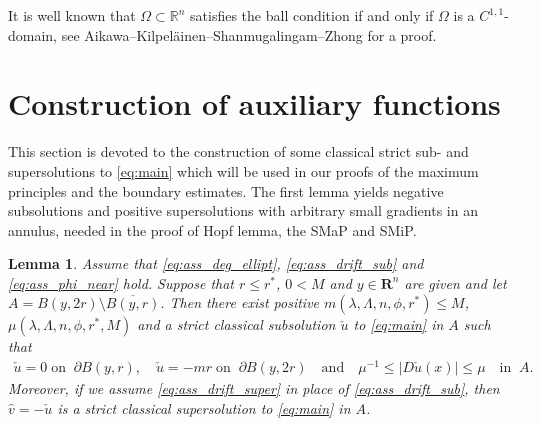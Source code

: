 \documentclass[12pt]{article}
\newtheorem{lemma}[theorem]{Lemma}
\numberwithin{komcounter}{section}
\begin{document}
It is well known that $\Omega\subset \mathbb{R}^n$ satisfies the ball condition if and only if $\Omega$ is a $C^{1,1}$-domain,
see Aikawa--Kilpel\"ainen--Shanmugalingam--Zhong \cite[Lemma 2.2]{AKSZ07} for a proof.


\setcounter{theorem}{0}
\setcounter{equation}{0}

\section{Construction of auxiliary functions}
\label{sec:auxiliary}

This section is devoted to the construction of some classical strict sub- and supersolutions to \eqref{eq:main}
which will be used in our proofs of the maximum principles and the boundary estimates.
The first lemma yields negative subsolutions and positive supersolutions with arbitrary small gradients in an annulus,
needed in the proof of Hopf lemma, the SMaP and SMiP.
%
\begin{lemma}%
\label{le:barrier_sub}
Assume that \eqref{eq:ass_deg_ellipt}, \eqref{eq:ass_drift_sub} and \eqref{eq:ass_phi_near} hold.
Suppose that $r \leq r^\ast$, $0 < M$ and $y \in \mathbf{R}^n$ are given and let $A = B(y,2r) \setminus \overline{B(y, r)}$.
Then there exist positive $m(\lambda, \Lambda, n,\phi, r^\ast) \leq {M}$, $\mu(\lambda, \Lambda, n, \phi, r^\ast, M)$ and a strict classical subsolution $\check{u}$ to \eqref{eq:main} in $A$ such that
%
\begin{align*}
\check{u} = 0 \;\text{on}\;\; \partial B(y, r), \quad  \check{u} = -mr \;\text{on}\;\;\partial B(y, 2r) \quad \text{and}\quad \mu^{-1}\leq |D \check{u}(x)| \leq \mu \quad \text{in}\;\; A.
\end{align*}
%
Moreover, if we assume \eqref{eq:ass_drift_super} in place of \eqref{eq:ass_drift_sub},
then $\hat{v} = -\check{u}$ is a strict classical supersolution to \eqref{eq:main} in  $A$.
\end{lemma}

\end{document}
